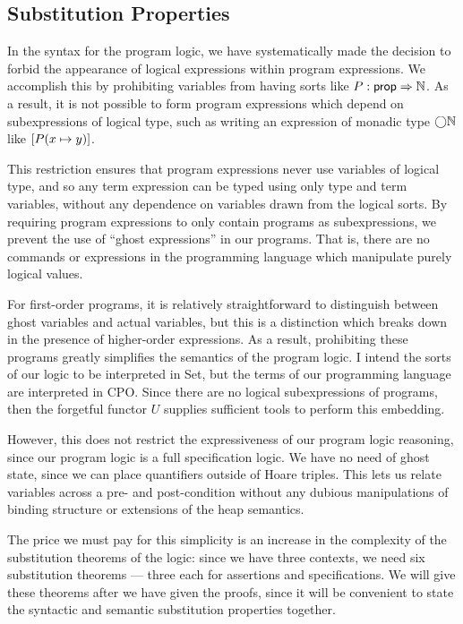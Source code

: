 \subsection{Substitution Properties}

In the syntax for the program logic, we have systematically made the
decision to forbid the appearance of logical expressions within
program expressions. We accomplish this by prohibiting variables from
having sorts like $P : \mathsf{prop} \Rightarrow \mathbb{N}$. As a result, it is not
possible to form program expressions which depend on subexpressions of
logical type, such as writing an expression of monadic type
$\bigcirc{\mathbb{N}}$ like $[P(x \mapsto y)]$.

This restriction ensures that program expressions never use variables
of logical type, and so any term expression can be typed using only
type and term variables, without any dependence on variables drawn
from the logical sorts. By requiring program expressions to only
contain programs as subexpressions, we prevent the use of ``ghost
expressions'' in our programs. That is, there are no commands or
expressions in the programming language which manipulate purely
logical values.

For first-order programs, it is relatively straightforward to
distinguish between ghost variables and actual variables, but this is
a distinction which breaks down in the presence of higher-order
expressions. As a result, prohibiting these programs greatly
simplifies the semantics of the program logic. I intend the sorts of
our logic to be interpreted in Set, but the terms of our programming
language are interpreted in CPO. Since there are no logical
subexpressions of programs, then the forgetful functor $U$ supplies
sufficient tools to perform this embedding. 

However, this does not restrict the expressiveness of our program
logic reasoning, since our program logic is a full specification
logic. We have no need of ghost state, since we can place quantifiers
outside of Hoare triples. This lets us relate variables across a pre-
and post-condition without any dubious manipulations of binding
structure or extensions of the heap semantics.

The price we must pay for this simplicity is an increase in the
complexity of the substitution theorems of the logic: since we have
three contexts, we need six substitution theorems --- three each for
assertions and specifications. We will give these theorems after we
have given the proofs, since it will be convenient to state the syntactic
and semantic substitution properties together. 


